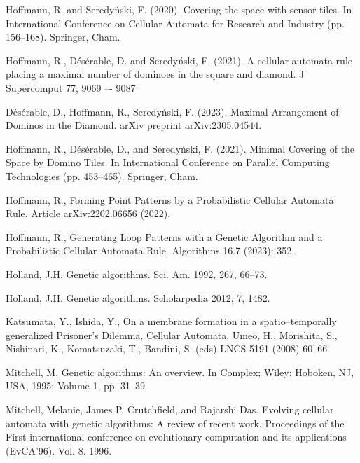 \documentclass[10pt,a4paper]{article}  %
\begin{document}
\begin{thebibliography}{99}
Hoffmann, R. and Seredy\'{n}ski, F. 
(2020). 
Covering the space with sensor tiles. 
In International Conference on Cellular Automata for Research and Industry (pp. 156--168). Springer, Cham.

Hoffmann, R., Désérable, D. and Seredy\'{n}ski, F.
(2021).
 A cellular automata rule placing a maximal number of dominoes in the square and diamond. 
J Supercomput 77, 9069 –- 9087 

D\'{e}s\'{e}rable, D., Hoffmann, R., Seredy\'{n}ski, F. (2023).
Maximal Arrangement of Dominos in the Diamond. 
arXiv preprint arXiv:2305.04544.


Hoffmann, R., Désérable, D., and Seredy\'{n}ski, F. 
(2021). 
Minimal Covering of the Space by Domino Tiles. In International Conference on Parallel Computing Technologies (pp. 453--465). Springer, Cham.%

Hoffmann, R.,
Forming Point Patterns by a Probabilistic Cellular Automata Rule.
 Article arXiv:2202.06656 (2022).

Hoffmann, R.,
Generating Loop Patterns with a Genetic Algorithm and a Probabilistic Cellular Automata Rule.
Algorithms 16.7 (2023): 352.

Holland, J.H. Genetic algorithms. Sci. Am. 1992, 267, 66--73.

Holland, J.H. Genetic algorithms. Scholarpedia 2012, 7, 1482.

Katsumata, Y., Ishida, Y., On a membrane formation in a spatio--temporally generalized Prisoner’s Dilemma, 
Cellular Automata, Umeo, H., Morishita, S., Nishinari,
K., Komatsuzaki, T., Bandini, S. (eds) LNCS 5191 (2008) 60--66

Mitchell, M. Genetic algorithms: An overview. In Complex; Wiley: Hoboken, NJ, USA, 1995; Volume 1, pp. 31--39

Mitchell, Melanie, James P. Crutchfield, and Rajarshi Das. 
Evolving cellular automata with genetic algorithms: A review of recent work.
 Proceedings of the First international conference on evolutionary computation and its applications (EvCA’96). 
Vol. 8. 1996.


\end{thebibliography}
\end{document}
